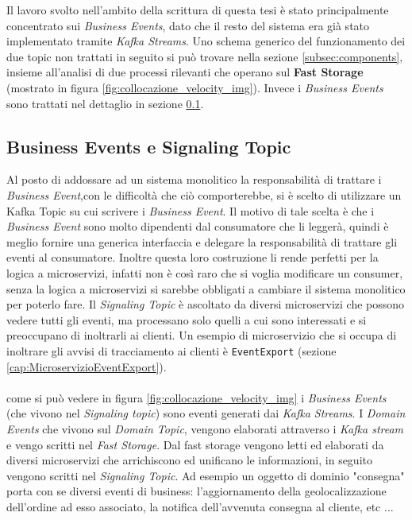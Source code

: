 Il lavoro svolto nell'ambito della scrittura di questa tesi è stato principalmente concentrato sui \textit{Business Events}, 
dato che il resto del sistema era già stato implementato tramite \textit{Kafka Streams}.
Uno schema generico del funzionamento dei due topic non trattati in seguito si può trovare nella sezione \ref{subsec:components}, insieme all'analisi di due processi
rilevanti che operano sul \textbf{Fast Storage} (mostrato in figura \ref{fig:collocazione_velocity_img}).
Invece i \textit{Business Events} sono trattati nel dettaglio in sezione \ref{subsec:business_events}.

\subsection{Business Events e Signaling Topic}
\label{subsec:business_events}
Al posto di addossare ad un sistema monolitico la responsabilità di trattare i \textit{Business Event},con le difficoltà che ciò comporterebbe,
si è scelto di utilizzare un Kafka Topic su cui scrivere i \textit{Business Event}. 
Il motivo di tale scelta è che i \textit{Business Event} sono molto dipendenti dal consumatore che li leggerà, quindi è meglio fornire una generica interfaccia
e delegare la responsabilità di trattare gli eventi al consumatore.
Inoltre questa loro costruzione li rende perfetti per la logica a microservizi, infatti non è così raro che si voglia modificare un consumer, senza la logica a microservizi
si sarebbe obbligati a cambiare il sistema monolitico per poterlo fare.
Il \textit{Signaling Topic} è ascoltato da diversi microservizi che possono vedere tutti gli eventi, ma processano solo quelli a cui sono interessati e si preoccupano di inoltrarli ai clienti.
Un esempio di microservizio che si occupa di inoltrare gli avvisi di tracciamento ai clienti è \texttt{EventExport} (sezione \ref{cap:MicroservizioEventExport}).
\\\\
come si può vedere in figura \ref{fig:collocazione_velocity_img} i \textit{Business Events} (che vivono nel \textit{Signaling topic}) sono eventi generati dai \textit{Kafka Streams}.
I \textit{Domain Events} che vivono sul \textit{Domain Topic}, vengono elaborati attraverso i \textit{Kafka stream} e vengo scritti nel \textit{Fast Storage}.
Dal fast storage vengono letti ed elaborati da diversi microservizi che arrichiscono ed unificano le informazioni, in seguito vengono scritti nel \textit{Signaling Topic}.
Ad esempio un oggetto di dominio "consegna" porta con se diversi eventi di business: l'aggiornamento della geolocalizzazione dell'ordine ad esso associato, la notifica dell'avvenuta consegna al cliente, etc ...

